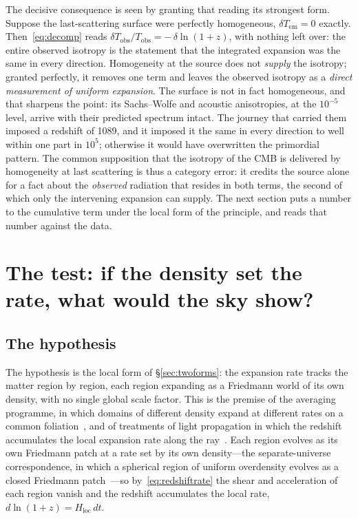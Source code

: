 \documentclass[11pt,a4paper]{article}
\begin{document}
The decisive consequence is seen by granting that reading its strongest form. Suppose the last-scattering surface were perfectly homogeneous, $\delta T_{\mathrm{em}} = 0$ exactly. Then~\eqref{eq:decomp} reads $\delta T_{\mathrm{obs}}/T_{\mathrm{obs}} = -\,\delta\ln(1+z)$, with nothing left over: the entire observed isotropy is the statement that the integrated expansion was the same in every direction. Homogeneity at the source does not \emph{supply} the isotropy; granted perfectly, it removes one term and leaves the observed isotropy as a \emph{direct measurement of uniform expansion}. The surface is not in fact homogeneous, and that sharpens the point: its Sachs--Wolfe and acoustic anisotropies, at the $10^{-5}$ level, arrive with their predicted spectrum intact. The journey that carried them imposed a redshift of 1089, and it imposed it the same in every direction to well within one part in $10^{5}$; otherwise it would have overwritten the primordial pattern. The common supposition that the isotropy of the CMB is delivered by homogeneity at last scattering is thus a category error: it credits the source alone for a fact about the \emph{observed} radiation that resides in both terms, the second of which only the intervening expansion can supply. The next section puts a number to the cumulative term under the local form of the principle, and reads that number against the data.

\section{The test: if the density set the rate, what would the sky show?}\label{sec:floor}

\subsection{The hypothesis}

The hypothesis is the local form of \S\ref{sec:twoforms}: the expansion rate tracks the matter region by region, each region expanding as a Friedmann world of its own density, with no single global scale factor. This is the premise of the averaging programme, in which domains of different density expand at different rates on a common foliation~\cite{Buchert2000, Buchert2008, Rasanen2004, Kolb2006, Clarkson2011, BuchertRasanen2012}, and of treatments of light propagation in which the redshift accumulates the local expansion rate along the ray~\cite{Rasanen2009}. Each region evolves as its own Friedmann patch at a rate set by its own density---the separate-universe correspondence, in which a spherical region of uniform overdensity evolves as a closed Friedmann patch~\cite{Peebles1980}---so by~\eqref{eq:redshiftrate} the shear and acceleration of each region vanish and the redshift accumulates the local rate, $d\ln(1+z)=H_{\mathrm{loc}}\,dt$.
\end{document}
